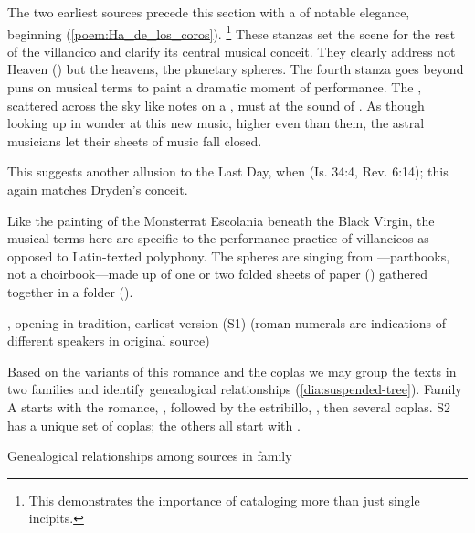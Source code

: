 The two earliest sources precede this section with a  of notable
elegance, beginning 
(\cref{poem:Ha_de_los_coros}).%
    \footnote{This demonstrates the importance of cataloging more than just
    single incipits.}
These stanzas set the scene for the rest of the villancico and clarify its
central musical conceit.
They clearly address not Heaven () but the heavens, the
planetary spheres.
The fourth stanza goes beyond puns on musical terms to paint a dramatic moment
of performance.
The , scattered across the sky like notes on a , must  at the sound of .
As though looking up in wonder at this new music, higher even than them, the
astral musicians let their sheets of music fall closed.%
\begin{Footnote}
    This suggests another allusion to the Last Day, when  (Is. 34:4, Rev. 6:14); this again matches
    Dryden's conceit.
\end{Footnote}
Like the painting of the Monsterrat Escolania beneath the Black Virgin, the
musical terms here are specific to the performance practice of villancicos as
opposed to Latin-texted polyphony.
The spheres are singing from ---partbooks, not a
choirbook---made up of one or two folded sheets of paper () gathered together in a folder ().

{, opening  in  tradition, earliest version (S1) (roman numerals are indications of
different speakers in original source)}

Based on the variants of this romance and the coplas we may group the
texts in two families and identify genealogical relationships
(\cref{dia:suspended-tree}).
Family A starts with the romance, ,
followed by the estribillo, ,
then several coplas.
S2 has a unique set of coplas; the others all start with .

{Genealogical relationships among sources in  family}

